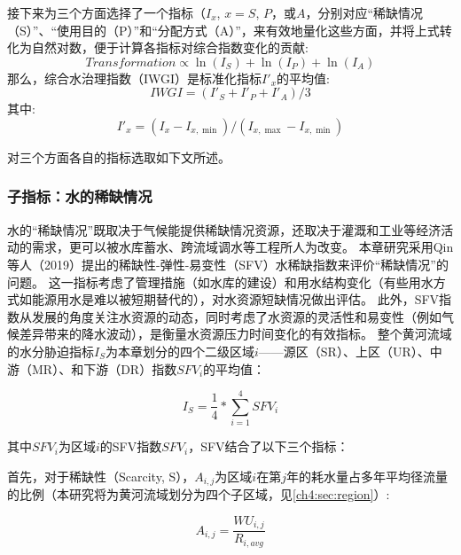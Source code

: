 接下来为三个方面选择了一个指标（$I_x$, $x=S$, $P$，或$A$，分别对应``稀缺情况（S）''、``使用目的（P）''和``分配方式（A）''，来有效地量化这些方面，并将上式转化为自然对数，便于计算各指标对综合指数变化的贡献:
\begin{equation}
    Transformation \propto \ln(I_S) + \ln(I_P) + \ln(I_A)
\end{equation}
那么，综合水治理指数（IWGI）是标准化指标$I'_x$的平均值:
\begin{equation}
    IWGI = (I'_S + I'_P + I'_A) / 3
    \label{ch4:eq:IWGI}
\end{equation}
其中:
\begin{equation}
    I'_x = (I_x - I_{x, \min}) / (I_{x, \max} - I_{x, \min})
\end{equation}

对三个方面各自的指标选取如下文所述。

\subsubsection{子指标：水的稀缺情况}

水的``稀缺情况''既取决于气候能提供稀缺情况资源，还取决于灌溉和工业等经济活动的需求，更可以被水库蓄水、跨流域调水等工程所人为改变\cite{qin2019,wada2014,huang2021}。
本章研究采用Qin等人（2019）提出的稀缺性-弹性-易变性（SFV）水稀缺指数来评价``稀缺情况''的问题\cite{qin2019}。
这一指标考虑了管理措施（如水库的建设）和用水结构变化（有些用水方式如能源用水是难以被短期替代的），对水资源短缺情况做出评估。
此外，SFV指数从发展的角度关注水资源的动态，同时考虑了水资源的灵活性和易变性（例如气候差异带来的降水波动），是衡量水资源压力\cite{qin2019}时间变化的有效指标。
整个黄河流域的水分胁迫指标$I_S$为本章划分的四个二级区域$i$——源区（SR）、上区（UR）、中游（MR）、和下游（DR）指数$SFV_{i}$的平均值：

\begin{equation}
    I_S = \frac{1}{4} * \sum_{i=1}^4 SFV_{i}
    \label{ch4:eq:scarcity}
\end{equation}

其中$SFV_i$为区域$i$的SFV指数$SFV_i$，SFV结合了以下三个指标：

首先，对于稀缺性（Scarcity, S），$A_{i, j}$为区域$i$在第$j$年的耗水量占多年平均径流量的比例（本研究将为黄河流域划分为四个子区域，见\ref{ch4:sec:region}）:

\begin{equation}
    A_{i, j} = \frac{WU_{i,j}}{R_{i, avg}}
\end{equation}

